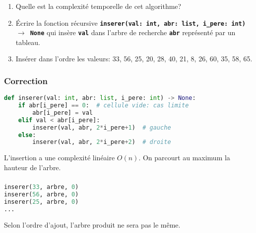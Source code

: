 \documentclass[svgnames,11pt]{beamer}
\begin{document}
\begin{frame}
    \frametitle{}

    \begin{activite}
    \begin{enumerate}
        \item Quelle est la complexité temporelle de cet algorithme?
        \item Écrire la fonction récursive \textbf{\texttt{inserer(val: int, abr: list, i\_pere: int) $\rightarrow$ None}} qui insère \textbf{\texttt{val}} dans l'arbre de recherche \textbf{\texttt{abr}} représenté par un tableau.
        \item Insérer dans l'ordre les valeurs: 33, 56, 25, 20, 28, 40, 21, 8, 26, 60, 35, 58, 65.
    \end{enumerate}
    \end{activite}

\end{frame}
\begin{frame}[fragile]
    \frametitle{Correction}

 \begin{center}
 \begin{lstlisting}[language=Python , basicstyle=\ttfamily\small, xleftmargin=.5em, xrightmargin=-1em]
def inserer(val: int, abr: list, i_pere: int) -> None:
    if abr[i_pere] == 0:  # cellule vide: cas limite
        abr[i_pere] = val
    elif val < abr[i_pere]:
        inserer(val, abr, 2*i_pere+1)  # gauche
    else:
        inserer(val, abr, 2*i_pere+2)  # droite
\end{lstlisting}
 \end{center}   
\begin{aretenir}[]
L'insertion a une complexité linéaire $O(n)$. On parcourt au maximum la hauteur de l'arbre.
\end{aretenir}
\end{frame}
\begin{frame}[fragile]
    \frametitle{}

\begin{center}
\begin{lstlisting}[language=Python , basicstyle=\ttfamily\small, xleftmargin=2em, xrightmargin=2em]
inserer(33, arbre, 0)
inserer(56, arbre, 0)
inserer(25, arbre, 0)
...
\end{lstlisting}
\end{center}   
\begin{aretenir}[Remarque]
Selon l'ordre d'ajout, l'arbre produit ne sera pas le même.
\end{aretenir}
\end{frame}
\end{document}
